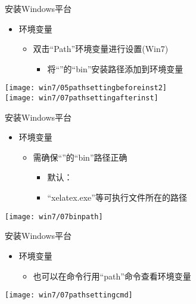 \documentclass[fontset = none, t]{ctexbeamer}
\begin{document}
\begin{frame}{安装\tl}{Windows平台}
  \begin{spacing}{1.5}
    \begin{itemize}
    \item 环境变量
      \begin{itemize}
      \item 双击\enquote{Path}环境变量进行设置(Win7)
        \begin{itemize}
        \item 将\enquote{\tl}的\enquote{bin}安装路径添加到环境变量
        \end{itemize}
      \end{itemize}
    \end{itemize}
    \begin{center}
      \texttt{[image: win7/05pathsettingbeforeinst2]}\\
      \texttt{[image: win7/07pathsettingafterinst]}
    \end{center}
  \end{spacing}         
\end{frame}

\begin{frame}{安装\tl}{Windows平台}
  \begin{spacing}{1.5}
    \begin{itemize}
    \item 环境变量
      \begin{itemize}
      \item 需确保\enquote{\tl}的\enquote{bin}路径正确
        \begin{itemize}
        \item 默认：
        \item \enquote{\alert{xelatex.exe}}等可执行文件所在的路径
        \end{itemize}
      \end{itemize}
    \end{itemize}
    \begin{center}
      \texttt{[image: win7/07binpath]}
    \end{center}
  \end{spacing}         
\end{frame}

\begin{frame}{安装\tl}{Windows平台}
  \begin{spacing}{1.5}
    \begin{itemize}
    \item 环境变量
      \begin{itemize}
      \item 也可以在命令行用\enquote{path}命令查看环境变量
      \end{itemize}
    \end{itemize}
    \begin{center}
      \texttt{[image: win7/07pathsettingcmd]}
    \end{center}
  \end{spacing}         
\end{frame}
\end{document}
